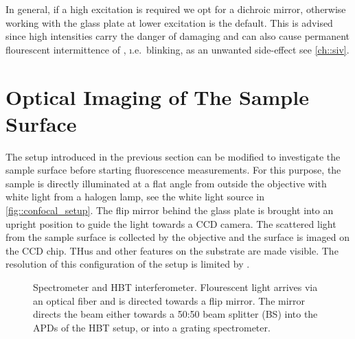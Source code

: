 		In general, if a high excitation is required we opt for a dichroic mirror, otherwise working with the glass plate at lower excitation is the default. This is advised since high intensities carry the danger of damaging \sivs and can also cause permanent flourescent intermittence of \sivs, \i.e.\ blinking, as an unwanted side-effect see \autoref{ch::siv}.

	\section[Surface Imaging]{Optical Imaging of The Sample Surface} \label{sec::methods_optical}

		The setup introduced in the previous section can be modified to investigate the sample surface before starting fluorescence measurements.
		For this purpose, the sample is directly illuminated at a flat angle from outside the objective with white light from a halogen lamp, see the white light source in \autoref{fig::confocal_setup}.
		The flip mirror behind the glass plate is brought into an upright position to guide the light towards a CCD camera.
		The scattered light from the sample surface is collected by the objective and the surface is imaged on the CCD chip.
		THus \nds and other features on the substrate are made visible.
		The resolution of this configuration of the setup is limited by .

		\begin{figure}[htb]
			\centering
			\caption[Spectrometer and HBT setup]{Spectrometer and HBT interferometer. Flourescent light arrives via an optical fiber and is directed towards a flip mirror. The mirror directs the beam either towards a 50:50 beam splitter (BS) into the APDs of the HBT setup, or into a grating spectrometer.}
			\label{fig::hbt_spectrometer}
		\end{figure}

